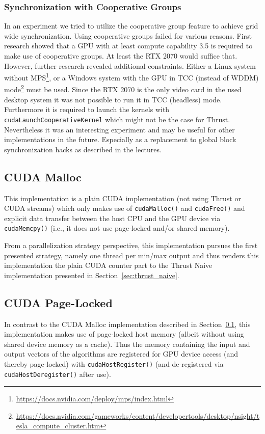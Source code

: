 \subsubsection{Synchronization with Cooperative Groups}
In an experiment we tried to utilize the cooperative group feature to achieve grid wide synchronization. Using cooperative groups failed for various reasons. First research showed that a GPU with at least compute capability 3.5 is required to make use of cooperative groups. At least the RTX 2070 would suffice that. However, further research revealed additional constraints. Either a Linux system without MPS\footnote{\url{https://docs.nvidia.com/deploy/mps/index.html}}, or a Windows system with the GPU in TCC (instead of WDDM) mode\footnote{\url{https://docs.nvidia.com/gameworks/content/developertools/desktop/nsight/tesla_compute_cluster.htm}} must be used. Since the RTX 2070 is the only video card in the used desktop system it was not possible to run it in TCC (headless) mode. Furthermore it is required to launch the kernels with \texttt{cudaLaunchCooperativeKernel} which might not be the case for Thrust. Nevertheless it was an interesting experiment and may be useful for other implementations in the future. Especially as a replacement to global block synchronization hacks as described in the lectures. 

\subsection{CUDA Malloc}
\label{sec:cuda_malloc}
This implementation is a plain CUDA implementation (not using Thrust or CUDA streams) which only makes use of \texttt{cudaMalloc()} and \texttt{cudaFree()} and explicit data transfer between the host CPU and the GPU device via \texttt{cudaMemcpy()} (i.e., it does not use page-locked and/or shared memory).

From a parallelization strategy perspective, this implementation pursues the first presented strategy, namely one thread per min/max output and thus renders this implementation the plain CUDA counter part to the Thrust Naive implementation presented in Section~\ref{sec:thrust_naive}.

\subsection{CUDA Page-Locked}
\label{sec:cuda_page_locked}
In contrast to the CUDA Malloc implementation described in Section~\ref{sec:cuda_malloc}, this implementation makes use of page-locked host memory (albeit without using shared device memory as a cache). Thus the memory containing the input and output vectors of the algorithms are registered for GPU device access (and thereby page-locked) with \texttt{cudaHostRegister()} (and de-registered via \texttt{cudaHostDeregister()} after use).

